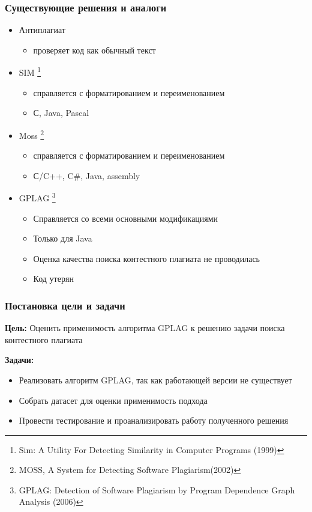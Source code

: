 \documentclass[10pt]{beamer}
\begin{document}
\begin{frame}[fragile]\frametitle{Существующие решения и аналоги}
	\begin{itemize}
		\item Антиплагиат
		\begin{itemize}
			\item проверяет код как обычный текст
		\end{itemize}
		\item SIM \footnote[frame]{Sim: A Utility For Detecting Similarity in Computer Programs (1999)}
		\begin{itemize}
			\item справляется с форматированием и переименованием
			\item С, Java, Pascal
		\end{itemize}
	    \item Moss \footnote[frame]{MOSS, A System for Detecting Software Plagiarism(2002)}
	    \begin{itemize}
	    	\item справляется с форматированием и переименованием
	    	\item С/C++, C#, Java, assembly
	    \end{itemize}
		\item GPLAG \footnote[frame]{GPLAG: Detection of Software Plagiarism by Program Dependence Graph Analysis (2006)}
		\begin{itemize}
			\item Справляется со всеми основными модификациями
			\item Только для Java
			\item Оценка качества поиска контестного плагиата не проводилась
			\item Код утерян
		\end{itemize}
	\end{itemize}
\end{frame}

\begin{frame}\frametitle{Постановка цели и задачи}
    \textbf{Цель:} Оценить применимость алгоритма GPLAG к решению задачи поиска контестного плагиата
    
    \textbf{Задачи:}
    \begin{itemize}
        \item Реализовать алгоритм GPLAG, так как работающей версии не существует
        \item Собрать датасет для оценки применимость подхода
        \item Провести тестирование и проанализировать работу полученного решения
    \end{itemize}
\end{frame}
\end{document}
